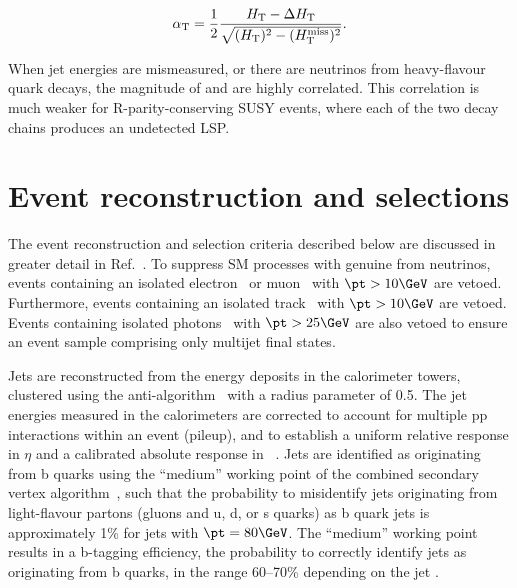 \begin{equation}
  \label{eq:alphat}
  \alpha_\mathrm{T} = \frac{1}{2} \frac{H_\text{T} -
    \Delta H_\text{T}}{\sqrt{(H_\text{T})^2 - (H_\text{T}^\text{miss})^2}}.
\end{equation}

When jet energies are mismeasured, or there are neutrinos from
heavy-flavour quark decays, the magnitude of \HTmiss and \dht are
highly correlated. This correlation is much weaker for
R-parity-conserving SUSY events, where each of the two decay chains
produces an undetected LSP.


\section{Event reconstruction and selections}
\label{sec:selections}

The event reconstruction and selection criteria described below are
discussed in greater detail in Ref.~\cite{RA1Paper2012}. To suppress
SM processes with genuine \ptvecmiss from neutrinos, events containing
an isolated electron~\cite{Khachatryan:2015hwa} or
muon~\cite{Chatrchyan:2012xi} with $\pt > 10\GeV$ are
vetoed. Furthermore, events containing an isolated
track~\cite{single-lepton-stop} with $\pt > 10\GeV$ are vetoed. Events
containing isolated photons~\cite{Khachatryan:2015iwa} with $\pt >
25\GeV$ are also vetoed to ensure an event sample comprising only
multijet final states.

Jets are reconstructed from the energy deposits in the calorimeter
towers, clustered using the anti-\kt algorithm~\cite{antikt} with a
radius parameter of 0.5. The jet energies measured in the calorimeters
are corrected to account for multiple pp interactions within an event
(pileup), and to establish a uniform relative response in $\eta$ and a
calibrated absolute response in \pt~\cite{Chatrchyan:2011ds}.  Jets
are identified as originating from b quarks using the ``medium''
working point of the combined secondary vertex
algorithm~\cite{Chatrchyan:2012jua}, such that the probability to
misidentify jets originating from light-flavour partons (gluons and u,
d, or s quarks) as b quark jets is approximately 1\% for jets with
$\pt = 80\GeV$. The ``medium'' working point results in a b-tagging
efficiency, \ie the probability to correctly identify jets as
originating from b quarks, in the range 60--70\% depending on the jet
\pt.


